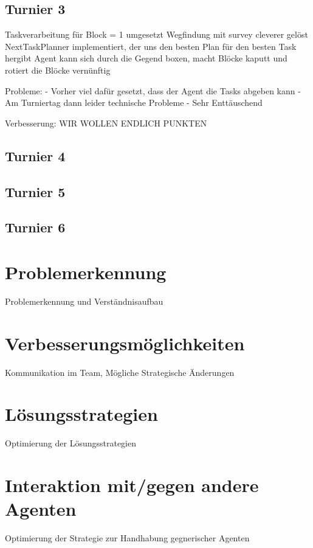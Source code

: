 \subsection{Turnier 3}
Taskverarbeitung für Block = 1 umgesetzt \newline
Wegfindung mit survey cleverer gelöst \newline
NextTaskPlanner implementiert, der uns den besten Plan für den besten Task hergibt \newline
Agent kann sich durch die Gegend boxen, macht Blöcke kaputt und rotiert die Blöcke vernünftig \newline

Probleme: 
- Vorher viel dafür gesetzt, dass der Agent die Tasks abgeben kann \newline
- Am Turniertag dann leider technische Probleme \newline
- Sehr Enttäuschend \newline

Verbesserung: WIR WOLLEN ENDLICH PUNKTEN

\subsection{Turnier 4}
\subsection{Turnier 5}
\subsection{Turnier 6}

\section{Problemerkennung}
Problemerkennung und Verständnisaufbau

\section{Verbesserungsmöglichkeiten}
Kommunikation im Team, Mögliche Strategische Änderungen

\section{Lösungsstrategien}
Optimierung der Lösungsstrategien

\section{Interaktion mit/gegen andere Agenten}
Optimierung der Strategie zur Handhabung gegnerischer Agenten
